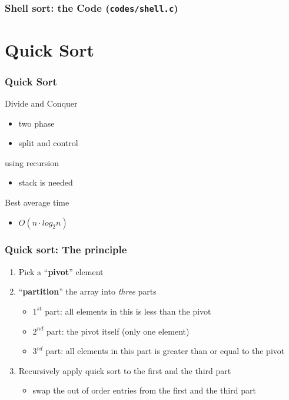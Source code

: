 \documentclass[newPxFont,sthlmFooter,nooffset]{beamer}
\begin{document}
\begin{frame}[t, fragile]
  \frametitle{Shell sort: the Code (\texttt{codes/shell.c})}
  


\end{frame}


\section{Quick Sort}



\begin{frame}[t, fragile]
  \frametitle{Quick Sort}
Divide and Conquer
\begin{itemize}
\item two phase
\item split and control
\end{itemize}

using recursion
\begin{itemize}
\item stack is needed
\end{itemize}

Best average time
\begin{itemize}
\item $O(n\cdot log_2n)$
\end{itemize}
\end{frame}


\begin{frame}[t, fragile]
  \frametitle{Quick sort: The principle}
  \begin{enumerate}
  \item Pick a ``\textbf{pivot}'' element
  \item ``\textbf{partition}'' the array into \textit{three} parts
    \begin{itemize}
    \item $1^{st}$ part: all elements in this is less than the pivot
    \item $2^{nd}$ part: the pivot itself (only one element)
    \item $3^{rd}$ part: all elements in this part is greater than or equal to the pivot
    \end{itemize}
  \item Recursively apply quick sort to the first and the third part
    \begin{itemize}
    \item swap the out of order entries from the first and the third part
    \end{itemize}
  \end{enumerate}


\end{frame}
\end{document}
